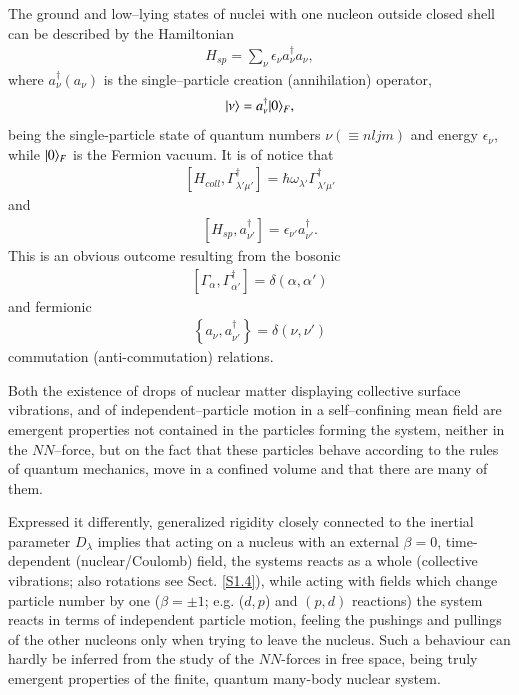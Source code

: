 The ground and low--lying states of nuclei with one nucleon outside closed shell can be described by the Hamiltonian
\begin{align}\label{eq1.0.10}
H_{sp}=\sum_{\nu}\epsilon_\nu a_\nu^\dagger a_\nu,
\end{align}
where $a_\nu^\dagger (a_\nu)$ is the single--particle creation (annihilation) operator,
\begin{align}\label{eq1.0.11}
|{\nu} \rangle=a_\nu^\dagger|{0} \rangle_F,
\end{align}
being the single-particle state of quantum numbers $\nu(\equiv nljm)$ and energy $\epsilon_\nu$, while $|{0} \rangle_F$ is the Fermion vacuum. 
It is of notice that
\begin{align}\label{eq0.1.14}
\left[H_{coll},\Gamma^\dagger_{\lambda'\mu'}\right]=\hbar\omega_{\lambda'}\Gamma^\dagger_{\lambda'\mu'}
\end{align}
and 
\begin{align}\label{eq0.1.15}
\left[H_{sp},a^\dagger_{\nu'}\right]=\epsilon_{\nu'}a^\dagger_{\nu'}.
\end{align}
	This is an obvious outcome resulting from the bosonic
\begin{align}\label{eq0.1.16}
\left[\Gamma_{\alpha},\Gamma^\dagger_{\alpha'}\right]=\delta(\alpha,\alpha')
\end{align}
	and fermionic
\begin{align}
\left\{a_\nu,a^\dagger_{\nu'}\right\}=\delta(\nu,\nu')
\end{align}
commutation (anti-commutation) relations.


Both the existence of drops of nuclear matter displaying collective surface vibrations, and of independent--particle motion in a self--confining mean field are emergent properties not contained in the particles forming the system, neither in the $NN$--force, but on the fact that these particles behave according to the rules of quantum mechanics, move in a confined volume and that there are many of them.


Expressed it differently, generalized rigidity closely connected to the inertial parameter $D_\lambda$ implies that acting on a nucleus with an external $\beta=0$, time-dependent (nuclear/Coulomb) field, the systems reacts as a whole (collective vibrations; also rotations see Sect. \ref{S1.4}), while acting with fields which change particle number by one ($\beta=\pm1$; e.g. ($d,p$) and $(p,d)$ reactions) the system reacts in terms of independent particle motion, feeling the pushings and pullings of the other nucleons only when trying to leave the nucleus. Such a behaviour can hardly be inferred from the study of the $NN$-forces in free space, being truly emergent properties of the finite, quantum many-body nuclear system.


